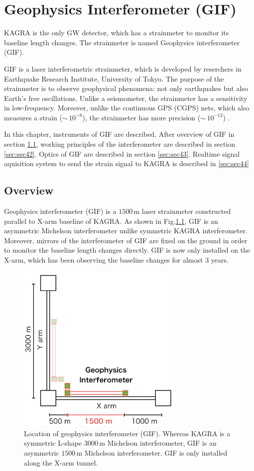 \chapter{Geophysics Interferometer (GIF)}
KAGRA is the only GW detector, which has a strainmeter to monitor its baseline length changes. The strainmeter is named Geophysics interferometer (GIF).

GIF is a laser interferometric strainmeter, which is developed by reserchers in Earthquake Research Institute, University of Tokyo. The purpose of the strainmeter is to observe geophysical phenomena: not only earthquakes but also Earth's free oscillations. Unlike a seismometer, the strainmeter has a sensitivity in low-frequency. Moreover, unlike the continuous GPS (CGPS) nets, which also measures a strain ($\sim\,10^{-8}$), the strainmeter has more precision ($\sim\,10^{-12}$) \cite{araya2007broadband}.

In this chapter, instruments of GIF are described. After overview of GIF in section \cref{sec:sec41}, working principles of the interferometer are described in section \cref{sec:sec42}. Optics of GIF are described in section \cref{sec:sec43}. Realtime signal aquisition system to send the strain signal to KAGRA is described in \cref{sec:sec44}

\section{Overview} \label{sec:sec41}
Geophysics interferometer (GIF) is a $1500\,\mathrm{m}$ laser strainmeter constructed parallel to X-arm baseline of KAGRA. As shown in Fig.\ref{img:img402}, GIF is an asymmetric Michelson interferometer unlike symmetric KAGRA interferometer. Moreover, mirrors of the interferometer of GIF are fixed on the ground in order to monitor the baseline length changes directly. GIF is now only installed on the X-arm, which has been observing the baseline changes for almost 3 years.
\begin{figure}[h]
  \centering
  \includegraphics[width=8cm]{./img_chap4/img402.png}
  \caption{Location of geophysics interferometer (GIF). Whereas KAGRA is a symmetric L-shape $3000\,\mathrm{m}$ Michelson interferometer, GIF is an asymmetric $1500\,\mathrm{m}$ Michelson interferometer. GIF is only installed along the X-arm tunnel.} \label{img:img402}
\end{figure}

